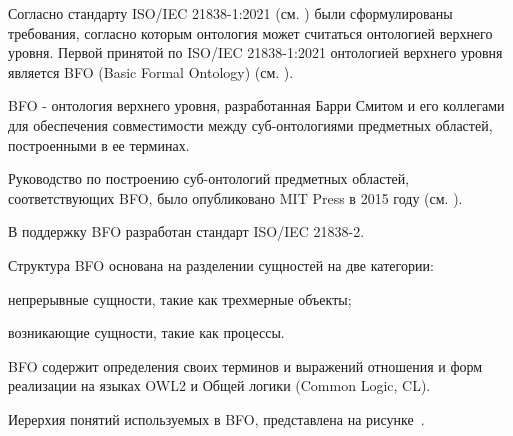 \begin{SCn}
\end{SCn}

Согласно стандарту ISO/IEC 21838-1:2021 (см. ) были сформулированы требования, согласно которым онтология может считаться онтологией верхнего уровня. Первой принятой по ISO/IEC 21838-1:2021 онтологией верхнего уровня является BFO (Basic Formal Ontology) (см. ).

BFO - онтология верхнего уровня, разработанная Барри Смитом и его коллегами для обеспечения совместимости между суб-онтологиями предметных областей, построенными в ее терминах. 

Руководство по построению суб-онтологий предметных областей, соответствующих BFO, было опубликовано MIT Press в 2015 году (см. ).

В поддержку BFO разработан стандарт ISO/IEC 21838-2.

Структура BFO основана на разделении сущностей на две категории:
\begin{textitemize}
	\item непрерывные сущности, такие как трехмерные объекты;
	\item возникающие сущности, такие как процессы.
\end{textitemize}

BFO содержит определения своих терминов и выражений отношения и форм реализации на языках OWL2 и Общей логики (Common Logic, CL).

Иерерхия понятий используемых в BFO, представлена на рисунке~\textit{}.

